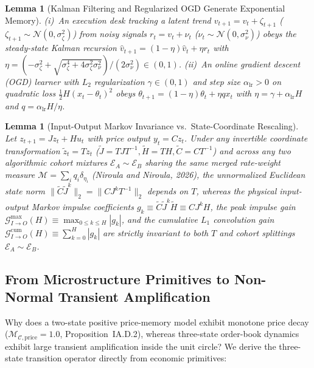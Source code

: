 \documentclass[11pt]{article}
\newtheorem{lemma}[theorem]{Lemma}
\theoremstyle{remark}
\begin{document}
\begin{lemma}[Kalman Filtering and Regularized OGD Generate Exponential Memory]
(i)~An execution desk tracking a latent trend $v_{t+1} = v_t + \zeta_{t+1}$ ($\zeta_{t+1} \sim \mathcal{N}(0,\sigma_\zeta^2)$) from noisy signals $r_t = v_t + \nu_t$ ($\nu_t \sim \mathcal{N}(0,\sigma_\nu^2)$) obeys the steady-state Kalman recursion $\hat{v}_{t+1} = (1-\eta)\hat{v}_t + \eta r_t$ with $\eta = (-\sigma_\zeta^2 + \sqrt{\sigma_\zeta^4 + 4\sigma_\zeta^2\sigma_\nu^2})/(2\sigma_\nu^2) \in (0,1)$. (ii)~An online gradient descent (OGD) learner with $L_2$ regularization $\gamma \in (0,1)$ and step size $\alpha_{\text{lr}} > 0$ on quadratic loss $\frac{1}{2}H(x_t-\theta_t)^2$ obeys $\theta_{t+1} = (1-\eta)\theta_t + \eta q x_t$ with $\eta = \gamma + \alpha_{\text{lr}}H$ and $q = \alpha_{\text{lr}}H/\eta$.
\end{lemma}

\begin{lemma}[Input-Output Markov Invariance vs.\ State-Coordinate Rescaling]
Let $z_{t+1} = J z_t + H u_t$ with price output $y_t = C z_t$. Under any invertible coordinate transformation $\tilde{z}_t = T z_t$ ($\tilde{J} = T J T^{-1}, \tilde{H} = T H, \tilde{C} = C T^{-1}$) and across any two algorithmic cohort mixtures $\mathcal{E}_A \sim \mathcal{E}_B$ sharing the same merged rate-weight measure $\mathcal{M} = \sum_i q_i \delta_{\eta_i}$ (Niroula and Niroula, 2026), the unnormalized Euclidean state norm $\|\tilde{C}\tilde{J}^k\|_2 = \|C J^k T^{-1}\|_2$ depends on $T$, whereas the physical input-output Markov impulse coefficients $g_k \equiv \tilde{C}\tilde{J}^k\tilde{H} \equiv C J^k H$, the peak impulse gain $\mathcal{G}_{I\to O}^{\max}(H) \equiv \max_{0 \le k \le H}|g_k|$, and the cumulative $L_1$ convolution gain $\mathcal{G}_{I\to O}^{\text{cum}}(H) \equiv \sum_{k=0}^H |g_k|$ are strictly invariant to both $T$ and cohort splittings $\mathcal{E}_A \sim \mathcal{E}_B$.
\end{lemma}

\subsection{From Microstructure Primitives to Non-Normal Transient Amplification}
Why does a two-state positive price-memory model exhibit monotone price decay ($\mathcal{M}_{\mathcal{C},\text{price}}=1.0$, Proposition~IA.D.2), whereas three-state order-book dynamics exhibit large transient amplification inside the unit circle? We derive the three-state transition operator directly from economic primitives:
\end{document}
